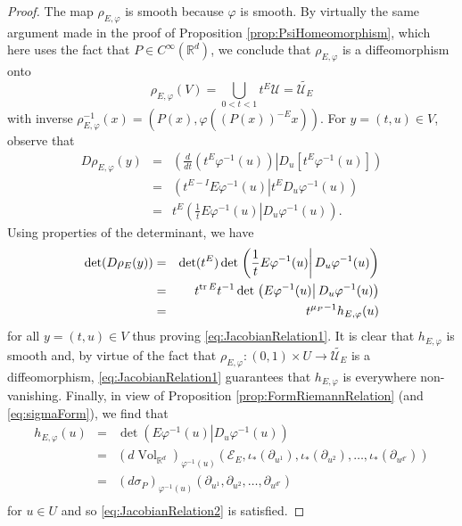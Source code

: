 \documentclass[11pt]{article}
\renewcommand\det{\operatorname{det}}
\newcommand{\Vol}{\operatorname{Vol}}
\begin{document}
\begin{proof}
The map $\rho_{E,\varphi}$ is smooth because $\varphi$ is smooth. By virtually the same argument made in the proof of Proposition \ref{prop:PsiHomeomorphism}, which here uses the fact that $P\in C^\infty(\mathbb{R}^d)$, we conclude that $\rho_{E,\varphi}$ is a diffeomorphism onto 
\begin{equation*}\rho_{E,\varphi}(V)=\bigcup_{0<t<1}t^E\mathcal{U}=\widetilde{\mathcal{U}_E}
\end{equation*}
with inverse $\rho_{E,\varphi}^{-1}(x)=(P(x),\varphi((P(x))^{-E}x))$. For $y=(t,u)\in V$, observe that
\begin{eqnarray*}
D\rho_{E,\varphi}(y)&=&\left.\left(\frac{d}{dt}(t^E\varphi^{-1}(u)) \right\vert D_u\left[t^E\varphi^{-1}(u)\right]\right)\\
&=&\left.\left(t^{E-I}E\varphi^{-1}(u)\right\vert t^E D_u\varphi^{-1}(u)\right)\\
&=&t^E\left.\left(\frac{1}{t}E\varphi^{-1}(u)\right\vert D_u\varphi^{-1}(u)\right).
\end{eqnarray*}
Using properties of the determinant, we have
\begin{eqnarray*}
    \det(D\rho_E(y))&=&\det(t^E)\det\left.\left(\frac{1}{t}E\varphi^{-1}(u)\right\vert D_u\varphi^{-1}(u)\right)\\
    &=&t^{\tr E}t^{-1}\det\left.\left(E\varphi^{-1}(u)\right\vert D_u\varphi^{-1}(u)\right)\\
    &=&t^{\mu_P-1}h_{E,\varphi}(u)
\end{eqnarray*}
for all $y=(t,u)\in V$ thus proving \eqref{eq:JacobianRelation1}. It is clear that $h_{E,\varphi}$ is smooth and, by virtue of the fact that $\rho_{E,\varphi}:(0,1)\times U\to \widetilde{\mathcal{U}_E}$ is a diffeomorphism, \eqref{eq:JacobianRelation1} guarantees that $h_{E,\varphi}$ is everywhere non-vanishing. Finally, 
in view of Proposition \ref{prop:FormRiemannRelation} (and \eqref{eq:sigmaForm}), we find that
\begin{eqnarray*}
    h_{E,\varphi}(u)&=&
    \det\left.\left(E\varphi^{-1}(u)\right\vert D_u\varphi^{-1}(u)\right)\\ \nonumber
    &=&
    (d\Vol_{\mathbb{R}^d})_{\varphi^{-1}(u)}(\mathcal{E}_E,\iota_*(\partial_{u^1}),\iota_*(\partial_{u^2}),\dots,\iota_*(\partial_{u^{d'}}))\\ \nonumber
    &=&\left(d\sigma_P\right)_{\varphi^{-1}(u)}(\partial_{u^1},\partial_{u^2},\dots,\partial_{u^{d'}})\\
\end{eqnarray*}
for $u\in U$ and so \eqref{eq:JacobianRelation2} is satisfied.
\end{proof}
\end{document}
